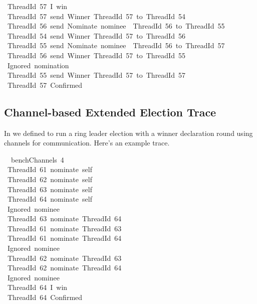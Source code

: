 \documentclass[sigplan,screen]{acmart}
\begin{document}
\begin{tabbing}
\ttfamily ~ThreadId~57~I~win\\
\ttfamily ~ThreadId~57~send~Winner~ThreadId~57~to~ThreadId~54\\
\ttfamily ~ThreadId~56~send~Nominate~nominee~~ThreadId~56~to~ThreadId~55\\
\ttfamily ~ThreadId~54~send~Winner~ThreadId~57~to~ThreadId~56\\
\ttfamily ~ThreadId~55~send~Nominate~nominee~~ThreadId~56~to~ThreadId~57\\
\ttfamily ~ThreadId~56~send~Winner~ThreadId~57~to~ThreadId~55\\
\ttfamily ~Ignored~nomination\\
\ttfamily ~ThreadId~55~send~Winner~ThreadId~57~to~ThreadId~57\\
\ttfamily ~ThreadId~57~Confirmed
\end{tabbing}

\normalsize







\subsection{Channel-based Extended Election Trace}
\label{apx:benchChannels-trace}

In  we defined  to run a ring
leader election with a winner declaration round using channels for
communication.
%
Here's an example trace.

\scriptsize

\begin{tabbing}\ttfamily
~~benchChannels~4\\
\ttfamily ~ThreadId~61~nominate~self\\
\ttfamily ~ThreadId~62~nominate~self\\
\ttfamily ~ThreadId~63~nominate~self\\
\ttfamily ~ThreadId~64~nominate~self\\
\ttfamily ~Ignored~nominee\\
\ttfamily ~ThreadId~63~nominate~ThreadId~64\\
\ttfamily ~ThreadId~61~nominate~ThreadId~63\\
\ttfamily ~ThreadId~61~nominate~ThreadId~64\\
\ttfamily ~Ignored~nominee\\
\ttfamily ~ThreadId~62~nominate~ThreadId~63\\
\ttfamily ~ThreadId~62~nominate~ThreadId~64\\
\ttfamily ~Ignored~nominee\\
\ttfamily ~ThreadId~64~I~win\\
\ttfamily ~ThreadId~64~Confirmed
\end{tabbing}
\end{document}
